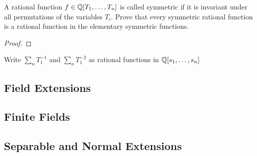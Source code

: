    \begin{ex}{14.22}
        A rational function $f\in\mathbb{Q}[T_1,\dots,T_n]$ is called symmetric if it is invariant under all permutations of the variables $T_i$. Prove that every symmetric rational function is a rational function in the elementary symmetric functions.
    \end{ex}
    \begin{proof}
        
    \end{proof}

    \begin{ex}{14.23}
        Write $\sum_{n}T_1^{-1}$ and $\sum_n T_1^{-2}$ as rational functions in $\mathbb{Q}[s_1,\dots,s_n]$
    \end{ex}
    \begin{sol}
        
    \end{sol}

\subsection{Field Extensions}

\subsection{Finite Fields}

\subsection{Separable and Normal Extensions}